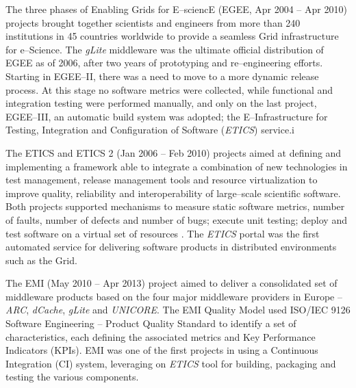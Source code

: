 \documentclass[journal]{IEEEtran}
\begin{document}
The three phases of Enabling Grids for E--sciencE (EGEE, Apr 2004 -- Apr 2010) \cite{cordis:egee} projects brought together scientists and engineers from more than 240 institutions in 45 countries worldwide to provide a seamless Grid infrastructure for e--Science. The {\sl gLite} middleware \cite{glite} was the ultimate official distribution of EGEE as of 2006, after two years of prototyping and re--engineering efforts. Starting in EGEE--II, there was a need to move to a more dynamic release process. At this stage no software metrics were collected, while functional and integration testing were performed manually, and only on the last project, EGEE--III, an automatic build system was adopted; the E--Infrastructure for Testing, Integration and Configuration of Software ({\sl ETICS}) service.i

The ETICS \cite{cordis:etics} and ETICS 2 \cite{cordis:etics2} (Jan 2006 -- Feb 2010) projects aimed at defining and implementing a framework able to integrate a combination of new technologies in test management, release management tools and resource virtualization to improve quality, reliability and interoperability of large--scale scientific software. Both projects supported mechanisms to measure static software metrics, number of faults, number of defects and number of bugs; execute unit testing; deploy and test software on a virtual set of resources \cite{etics}. The {\sl ETICS} portal was the first automated service for delivering software products in distributed environments such as the Grid.

The EMI (May 2010 -- Apr 2013) project \cite{cordis:emi} aimed to deliver a consolidated set of middleware products based on the four major middleware providers in Europe -- {\sl ARC}, {\sl dCache}, {\sl gLite} and {\sl UNICORE}. The EMI Quality Model used ISO/IEC 9126 Software Engineering -- Product Quality Standard \cite{iso9126} to identify a set of characteristics, each defining the associated metrics and Key Performance Indicators (KPIs). EMI was one of the first projects in using a Continuous Integration (CI) system, leveraging on {\sl ETICS} tool  for building, packaging and testing the various components.
\end{document}
